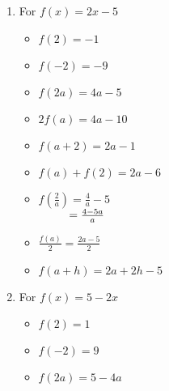 \begin{enumerate}
\setcounter{enumi}{\value{HW}}

\item For $f(x) = 2x-5$

\begin{multicols}{3}
\begin{itemize}

\item  $f(2) = -1$
\item  $f(-2) = -9$
\item  $f(2a) = 4a-5$

\end{itemize}
\end{multicols}

\begin{multicols}{3}
\begin{itemize}

\item  $2 f(a) = 4a-10$
\item $f(a+2) = 2a-1$
\item $f(a) + f(2) = 2a-6$

\end{itemize}
\end{multicols}

\begin{multicols}{3}
\begin{itemize}

\item  $f \left( \frac{2}{a} \right) = \frac{4}{a} - 5$ \\
$\hphantom{f \left( \frac{2}{a} \right)} = \frac{4-5a}{a}$

\vfill

\columnbreak

\item $\frac{f(a)}{2} =\frac{2a-5}{2}$

\vfill

\columnbreak


\item  $f(a + h) = 2a + 2h - 5$

\end{itemize}
\end{multicols}

\item For $f(x) = 5-2x$

\begin{multicols}{3}
\begin{itemize}

\item  $f(2) = 1$
\item  $f(-2) = 9$
\item  $f(2a) = 5-4a$


\end{itemize}
\end{multicols}
\end{enumerate}
